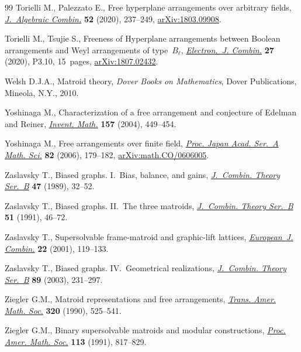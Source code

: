 \documentclass[pdftex]{sigma}
\numberwithin{equation}{section}
\begin{document}
\begin{thebibliography}{99}
Torielli M., Palezzato E., Free hyperplane arrangements over arbitrary fields,
 \href{https://doi.org/10.1007/s10801-019-00901-x}{\textit{J.~Algebraic Combin.}} \textbf{52} (2020), 237--249,
 \href{https://arxiv.org/abs/1803.09908}{arXiv:1803.09908}.

Torielli M., Tsujie S., Freeness of Hyperplane arrangements between {B}oolean
 arrangements and {W}eyl arrangements of type~$B_\ell$, \href{https://doi.org/10.37236/9341}{\textit{Electron.~J.
 Combin.}} \textbf{27} (2020), P3.10, 15~pages, \href{https://arxiv.org/abs/1807.02432}{arXiv:1807.02432}.

Welsh D.J.A., Matroid theory, \textit{Dover Books on Mathematics}, Dover Publications,
 Mineola, N.Y., 2010.

Yoshinaga M., Characterization of a free arrangement and conjecture of
 {E}delman and {R}einer, \href{https://doi.org/10.1007/s00222-004-0359-2}{\textit{Invent. Math.}} \textbf{157} (2004), 449--454.

Yoshinaga M., Free arrangements over finite field, \href{https://doi.org/10.3792/pjaa.82.179}{\textit{Proc. Japan Acad.
 Ser.~A Math. Sci.}} \textbf{82} (2006), 179--182, \href{https://arxiv.org/abs/math.CO/0606005}{arXiv:math.CO/0606005}.

Zaslavsky T., Biased graphs. {I}.~{B}ias, balance, and gains,
 \href{https://doi.org/10.1016/0095-8956(89)90063-4}{\textit{J.~Combin. Theory Ser.~B}} \textbf{47} (1989), 32--52.

Zaslavsky T., Biased graphs. {II}.~{T}he three matroids, \href{https://doi.org/10.1016/0095-8956(91)90005-5}{\textit{J.~Combin.
 Theory Ser.~B}} \textbf{51} (1991), 46--72.

Zaslavsky T., Supersolvable frame-matroid and graphic-lift lattices,
 \href{https://doi.org/10.1006/eujc.2000.0418}{\textit{European~J. Combin.}} \textbf{22} (2001), 119--133.

Zaslavsky T., Biased graphs. {IV}.~{G}eometrical realizations, \href{https://doi.org/10.1016/S0095-8956(03)00035-2}{\textit{J.~Combin. Theory Ser.~B}} \textbf{89} (2003), 231--297.

Ziegler G.M., Matroid representations and free arrangements, \href{https://doi.org/10.2307/2001687}{\textit{Trans.
 Amer. Math. Soc.}} \textbf{320} (1990), 525--541.

Ziegler G.M., Binary supersolvable matroids and modular constructions,
 \href{https://doi.org/10.2307/2048620}{\textit{Proc. Amer. Math. Soc.}} \textbf{113} (1991), 817--829.

\end{thebibliography}\LastPageEnding
\end{document}

